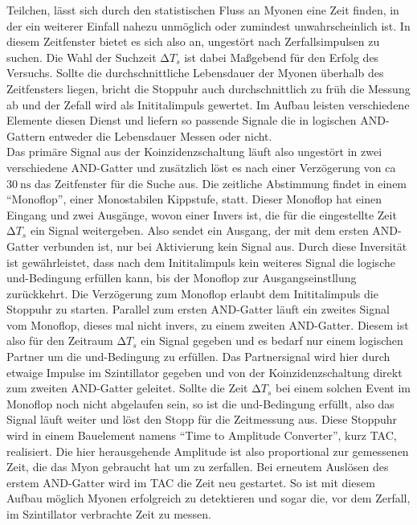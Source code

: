 Teilchen, lässt sich durch den statistischen Fluss an Myonen eine Zeit finden, in der ein weiterer Einfall nahezu unmöglich oder zumindest unwahrscheinlich ist.
In diesem Zeitfenster bietet es sich also an, ungestört nach Zerfallsimpulsen zu suchen. Die Wahl der Suchzeit $\increment T_s$
ist dabei Maßgebend für den Erfolg des Versuchs. Sollte die durchschnittliche Lebensdauer der Myonen überhalb des Zeitfensters liegen, 
bricht die Stoppuhr auch durchschnittlich zu früh die Messung ab und der Zefall wird als Inititalimpuls gewertet. 
Im Aufbau leisten verschiedene Elemente diesen Dienst und liefern so passende Signale die in logischen AND-Gattern entweder die Lebensdauer Messen oder nicht.
\\
\newline
Das primäre Signal aus der Koinzidenzschaltung läuft also ungestört in zwei verschiedene AND-Gatter und zusätzlich löst es nach einer Verzögerung von ca $\SI{30}{\nano\second}$
das Zeitfenster für die Suche aus.
Die zeitliche Abstimmung findet in einem \enquote{Monoflop}, einer Monostabilen Kippstufe, statt. Dieser Monoflop
hat einen Eingang und zwei Ausgänge, wovon einer Invers ist, die für die eingestellte Zeit $\increment T_s$ ein Signal weitergeben. Also sendet ein Ausgang, der mit dem ersten AND-Gatter verbunden ist,
nur bei Aktivierung kein Signal aus. Durch diese Inversität ist gewährleistet, dass nach dem Inititalimpuls kein weiteres Signal die logische und-Bedingung erfüllen kann, bis 
der Monoflop zur Ausgangseinstllung zurückkehrt. Die Verzögerung zum Monoflop erlaubt dem Inititalimpuls die Stoppuhr zu starten. 
Parallel zum ersten AND-Gatter läuft ein zweites Signal vom Monoflop, dieses mal nicht invers, zu einem zweiten AND-Gatter.
Diesem ist also für den Zeitraum $\increment T_s$ ein Signal gegeben und es bedarf nur einem logischen Partner um die und-Bedingung zu erfüllen. 
Das Partnersignal wird hier durch etwaige Impulse im Szintillator gegeben und von der Koinzidenzschaltung direkt zum zweiten AND-Gatter geleitet.
Sollte die Zeit $\increment T_s$ bei einem solchen Event im Monoflop noch nicht abgelaufen sein, so ist die und-Bedingung erfüllt,
also das Signal läuft weiter und löst den Stopp für die Zeitmessung aus.
Diese Stoppuhr wird in einem Bauelement namens \enquote{Time to Amplitude Converter}, kurz TAC, realisiert. 
Die hier herausgehende Amplitude ist also proportional zur gemessenen Zeit, die das Myon gebraucht hat um zu zerfallen. Bei erneutem Auslösen des erstem AND-Gatter wird 
im TAC die Zeit neu gestartet.
So ist mit diesem Aufbau möglich Myonen erfolgreich zu detektieren und sogar die, vor dem Zerfall, im Szintillator verbrachte Zeit zu messen.
